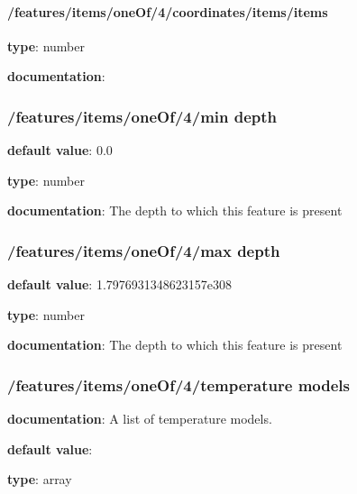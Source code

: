\begin{itemized}
\begin{itemized}
\paragraph{/features/items/oneOf/4/coordinates/items/items} \begin{itemized}
\item {\bf type}: number
\end{itemized}\item {\bf documentation}: 
\end{itemized}\end{itemized}\subsubsection{/features/items/oneOf/4/min depth} \begin{itemized}
\item {\bf default value}: 0.0
\item {\bf type}: number
\item {\bf documentation}: The depth to which this feature is present
\end{itemized}\subsubsection{/features/items/oneOf/4/max depth} \begin{itemized}
\item {\bf default value}: 1.7976931348623157e308
\item {\bf type}: number
\item {\bf documentation}: The depth to which this feature is present
\end{itemized}\subsubsection{/features/items/oneOf/4/temperature models} \begin{itemized}
\item {\bf documentation}: A list of temperature models.
\item {\bf default value}: 
\item {\bf type}: array

\end{itemized}
